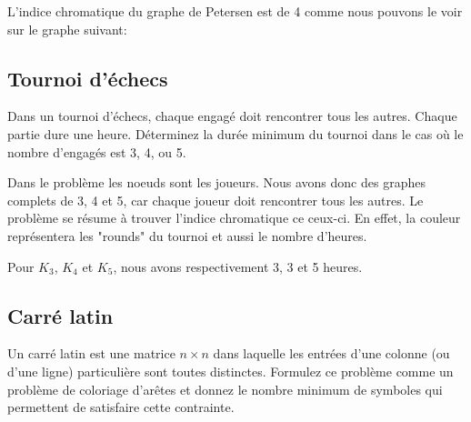\begin{solution}
L'indice chromatique du graphe de Petersen est de 4 comme nous pouvons le voir sur le graphe suivant:

\end{solution}

\subsection{Tournoi d'échecs}
Dans un tournoi d'échecs, chaque engagé doit rencontrer tous les autres. Chaque partie dure une heure. Déterminez la durée minimum du tournoi dans le cas où le nombre d'engagés est 3, 4, ou 5.

\begin{solution}
Dans le problème les noeuds sont les joueurs. Nous avons donc des graphes complets de 3, 4 et 5, car chaque joueur doit rencontrer tous les autres. Le problème se résume à trouver l'indice chromatique ce ceux-ci. En effet, la couleur représentera les "rounds" du tournoi et aussi le nombre d'heures.

Pour $K_{3}$, $K_{4}$ et $K_{5}$, nous avons respectivement 3, 3 et 5 heures.
\end{solution}

\subsection{Carré latin}
Un carré latin est une matrice $n \times n$ dans laquelle les entrées d'une colonne (ou d'une ligne) particulière sont toutes distinctes. Formulez ce problème comme un problème de coloriage d'arêtes et donnez le nombre minimum de symboles qui permettent de satisfaire cette contrainte.
